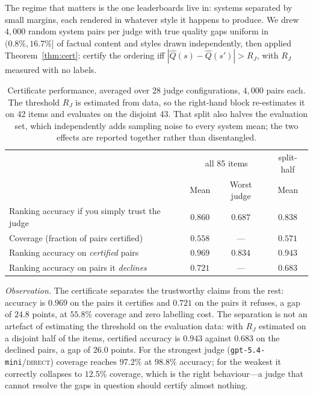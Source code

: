 \documentclass{article}
\theoremstyle{plain}
\theoremstyle{definition}
\newcommand{\Qhat}{\hat{Q}}
\begin{document}
The regime that matters is the one leaderboards live in: systems separated by small margins,
each rendered in whatever style it happens to produce. We drew $4{,}000$ random system pairs
per judge with true quality gaps uniform in $(0.8\%,16.7\%]$ of factual content and styles
drawn independently, then applied Theorem~\ref{thm:cert}: certify the ordering iff
$|\Qhat(s)-\Qhat(s')|>R_J$, with $R_J$ measured with no labels.

\begin{table}[t]
\caption{Certificate performance, averaged over 28 judge configurations, $4{,}000$ pairs each.
The threshold $R_J$ is estimated from data, so the right-hand block re-estimates it on 42
items and evaluates on the disjoint 43. That split also halves the evaluation set, which
independently adds sampling noise to every system mean; the two effects are reported together
rather than disentangled.}
\label{tab:cert}
\centering
\begin{tabular}{lccc}
\toprule
& \multicolumn{2}{c}{all 85 items} & split-half \\
& Mean & Worst judge & Mean \\
\midrule
Ranking accuracy if you simply trust the judge & $0.860$ & $0.687$ & $0.838$ \\
Coverage (fraction of pairs certified)         & $0.558$ & --- & $0.571$ \\
Ranking accuracy on \emph{certified} pairs     & $\mathbf{0.969}$ & $0.834$ & $\mathbf{0.943}$ \\
Ranking accuracy on pairs it \emph{declines}   & $0.721$ & --- & $0.683$ \\
\bottomrule
\end{tabular}
\end{table}

\emph{Observation.} The certificate separates the trustworthy claims from the rest: accuracy
is $0.969$ on the pairs it certifies and $0.721$ on the pairs it refuses, a gap of $24.8$
points, at $55.8\%$ coverage and zero labelling cost. The separation is not an artefact of
estimating the threshold on the evaluation data: with $R_J$ estimated on a disjoint half of
the items, certified accuracy is $0.943$ against $0.683$ on the declined pairs, a gap of
$26.0$ points. For the strongest judge
(\texttt{gpt-5.4-mini}/\textsc{direct}) coverage reaches $97.2\%$ at $98.8\%$ accuracy; for the
weakest it correctly collapses to $12.5\%$ coverage, which is the right behaviour---a judge
that cannot resolve the gaps in question should certify almost nothing.
\end{document}
